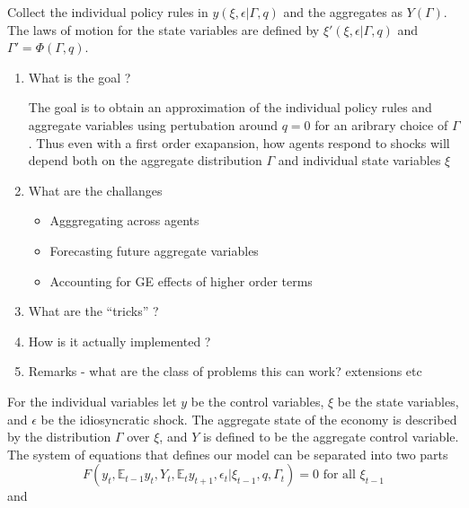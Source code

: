 \documentclass[thmsb,11pt]{article}
\newcommand{\EE}{\mathbb E}
\begin{document}
{\color{blue}
  Collect the individual policy rules in $y(\xi,\epsilon|\Gamma,q)$ and the aggregates as $Y(\Gamma)$. The laws of motion for the state variables are defined by $\xi'(\xi,\epsilon|\Gamma,q)$ and $\Gamma'=\Phi(\Gamma,q)$.
\begin{enumerate}


\item What is the goal ?

  The goal is to obtain an approximation of the individual policy rules and aggregate variables using pertubation around $q=0$ for an aribrary choice of $\Gamma$. Thus even with a first order exapansion, how agents respond to shocks will depend both on the aggregate distribution  $\Gamma$ and individual state variables $\xi$

\item What are the challanges

  \begin{itemize}
  \item Agggregating across agents 
  \item Forecasting future aggregate variables
  \item Accounting for GE effects of higher order terms
  \end{itemize}

\item What are the ``tricks'' ?

\item How is it actually implemented ?
\item Remarks - what are the class of problems this can work? extensions etc
\end{enumerate}}
For the individual variables let $y$ be the control variables, $\xi$ be the  state variables, and  $\epsilon$ be the idiosyncratic shock.  The aggregate state of the economy is described by the distribution $\Gamma$ over $\xi$, and $Y$ is defined to be the aggregate control variable.  The system of equations that defines our model can be separated into two parts
\begin{equation}\label{eq.ind_con}
	F(y_t, \EE_{t-1} y_t, Y_t, \EE_t y_{t+1} ,\epsilon_t| \xi_{t-1},q,\Gamma_t) = 0  \text{  for all $\xi_{t-1}$}
\end{equation}and
\end{document}

